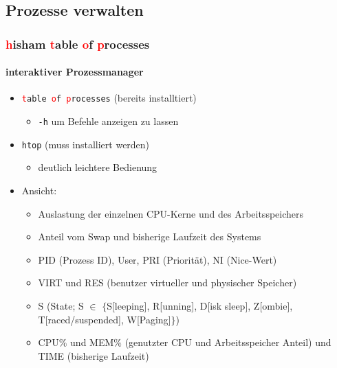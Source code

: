 \documentclass[12pt,utf8, handout]{beamer}
\begin{document}
\subsection{Prozesse verwalten}
\begin{frame}
\frametitle{\textcolor{red}{h}isham \textcolor{red}{t}able \textcolor{red}{o}f \textcolor{red}{p}rocesses}
\framesubtitle{interaktiver Prozessmanager}
\begin{itemize}
	\item \texttt{\textcolor{red}{t}able \textcolor{red}{o}f \textcolor{red}{p}rocesses} (bereits installtiert)
	\begin{itemize}[<+->]
		\item {\scriptsize \texttt{-h} um Befehle anzeigen zu lassen}
	\end{itemize}
	\item \texttt{htop} (muss installiert werden)
	\begin{itemize}[<+->]
		\item {\scriptsize deutlich leichtere Bedienung}
	\end{itemize}
	\item Ansicht:
	\begin{itemize}[<+->]
		\item {\scriptsize Auslastung der einzelnen CPU-Kerne und des Arbeitsspeichers}
		\item {\scriptsize Anteil vom Swap und bisherige Laufzeit des Systems}
		\item {\scriptsize PID (Prozess ID), User, PRI (Priorität), NI (Nice-Wert)}
		\item {\scriptsize VIRT und RES (benutzer virtueller und physischer Speicher)}
		\item {\scriptsize S (State; S $\in$ $\{${\footnotesize S[leeping], R[unning], D[isk sleep], Z[ombie], T[raced/suspended], W[Paging]}$\}$)}
		\item {\scriptsize CPU$\%$ und MEM$\%$ (genutzter CPU und Arbeitsspeicher Anteil) und TIME (bisherige Laufzeit)}
	\end{itemize}
\end{itemize}
\end{frame}
\end{document}
